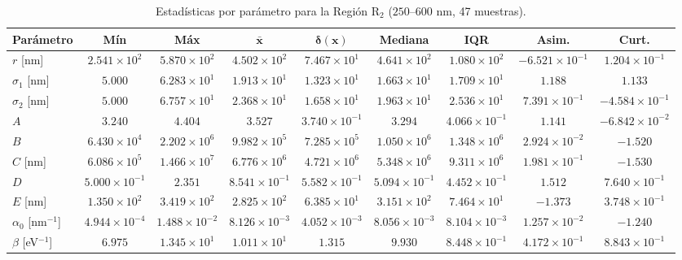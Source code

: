 \documentclass{article}
\begin{document}
\begin{table}[htbp]
\centering
\caption{Estad\'isticas por par\'ametro para la Regi\'on R$_2$ ($250$--$600$ nm, 47 muestras).}
\label{tab:bin1}
\begin{tabular}{@{}lcccccccc@{}} %
\toprule
\textbf{Par\'ametro} & \textbf{M\'in} & \textbf{M\'ax} & $\boldsymbol{\bar{x}}$ & $\boldsymbol{\delta(x)}$ & \textbf{Mediana} & \textbf{IQR} & \textbf{Asim.} & \textbf{Curt.} \\
\midrule
$r$ [nm] & $2.541 \times 10^2$ & $5.870 \times 10^2$ & $4.502 \times 10^2$ & $7.467 \times 10^1$ & $4.641 \times 10^2$ & $1.080 \times 10^2$ & $-6.521 \times 10^{-1}$ & $1.204 \times 10^{-1}$ \\
$\sigma_{1}$ [nm] & $5.000$ & $6.283 \times 10^1$ & $1.913 \times 10^1$ & $1.323 \times 10^1$ & $1.663 \times 10^1$ & $1.709 \times 10^1$ & $1.188$ & $1.133$ \\
$\sigma_{2}$ [nm] & $5.000$ & $6.757 \times 10^1$ & $2.368 \times 10^1$ & $1.658 \times 10^1$ & $1.963 \times 10^1$ & $2.536 \times 10^1$ & $7.391 \times 10^{-1}$ & $-4.584 \times 10^{-1}$ \\
$A$ & $3.240$ & $4.404$ & $3.527$ & $3.740 \times 10^{-1}$ & $3.294$ & $4.066 \times 10^{-1}$ & $1.141$ & $-6.842 \times 10^{-2}$ \\
$B$ & $6.430 \times 10^4$ & $2.202 \times 10^6$ & $9.982 \times 10^5$ & $7.285 \times 10^5$ & $1.050 \times 10^6$ & $1.348 \times 10^6$ & $2.924 \times 10^{-2}$ & $-1.520$ \\
$C$ [nm] & $6.086 \times 10^5$ & $1.466 \times 10^7$ & $6.776 \times 10^6$ & $4.721 \times 10^6$ & $5.348 \times 10^6$ & $9.311 \times 10^6$ & $1.981 \times 10^{-1}$ & $-1.530$ \\
$D$ & $5.000 \times 10^{-1}$ & $2.351$ & $8.541 \times 10^{-1}$ & $5.582 \times 10^{-1}$ & $5.094 \times 10^{-1}$ & $4.452 \times 10^{-1}$ & $1.512$ & $7.640 \times 10^{-1}$ \\
$E$ [nm] & $1.350 \times 10^2$ & $3.419 \times 10^2$ & $2.825 \times 10^2$ & $6.385 \times 10^1$ & $3.151 \times 10^2$ & $7.464 \times 10^1$ & $-1.373$ & $3.748 \times 10^{-1}$ \\
$\alpha_{0}$ [nm$^{-1}$] & $4.944 \times 10^{-4}$ & $1.488 \times 10^{-2}$ & $8.126 \times 10^{-3}$ & $4.052 \times 10^{-3}$ & $8.056 \times 10^{-3}$ & $8.104 \times 10^{-3}$ & $1.257 \times 10^{-2}$ & $-1.240$ \\
$\beta$ [eV$^{-1}$] & $6.975$ & $1.345 \times 10^1$ & $1.011 \times 10^1$ & $1.315$ & $9.930$ & $8.448 \times 10^{-1}$ & $4.172 \times 10^{-1}$ & $8.843 \times 10^{-1}$ \\

\end{tabular}
\end{table}
\end{document}
